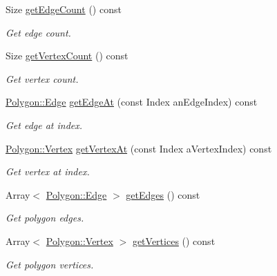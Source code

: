 \begin{DoxyCompactItemize}
Size \hyperlink{classlibrary_1_1math_1_1geom_1_1d3_1_1objects_1_1_polygon_aa9ff0300eec7d810c55c2782fcc46cf6}{get\+Edge\+Count} () const
\begin{DoxyCompactList}\small\item\em Get edge count. \end{DoxyCompactList}\item 
Size \hyperlink{classlibrary_1_1math_1_1geom_1_1d3_1_1objects_1_1_polygon_abdd6fd98e2d0aa2ddb69d842cd7e71c1}{get\+Vertex\+Count} () const
\begin{DoxyCompactList}\small\item\em Get vertex count. \end{DoxyCompactList}\item 
\hyperlink{classlibrary_1_1math_1_1geom_1_1d3_1_1objects_1_1_polygon_a7962e0559e972fe43eef942ce318fb8d}{Polygon\+::\+Edge} \hyperlink{classlibrary_1_1math_1_1geom_1_1d3_1_1objects_1_1_polygon_aa595f3aa1b457b453745692ccee8a808}{get\+Edge\+At} (const Index an\+Edge\+Index) const
\begin{DoxyCompactList}\small\item\em Get edge at index. \end{DoxyCompactList}\item 
\hyperlink{classlibrary_1_1math_1_1geom_1_1d3_1_1objects_1_1_polygon_a12c41d13f2128442c1a15b9eaa08e1d0}{Polygon\+::\+Vertex} \hyperlink{classlibrary_1_1math_1_1geom_1_1d3_1_1objects_1_1_polygon_a3a4caaa18b07b7be061ef8b525493c5e}{get\+Vertex\+At} (const Index a\+Vertex\+Index) const
\begin{DoxyCompactList}\small\item\em Get vertex at index. \end{DoxyCompactList}\item 
Array$<$ \hyperlink{classlibrary_1_1math_1_1geom_1_1d3_1_1objects_1_1_polygon_a7962e0559e972fe43eef942ce318fb8d}{Polygon\+::\+Edge} $>$ \hyperlink{classlibrary_1_1math_1_1geom_1_1d3_1_1objects_1_1_polygon_a90b876b752d49e7f7c65976d2f367086}{get\+Edges} () const
\begin{DoxyCompactList}\small\item\em Get polygon edges. \end{DoxyCompactList}\item 
Array$<$ \hyperlink{classlibrary_1_1math_1_1geom_1_1d3_1_1objects_1_1_polygon_a12c41d13f2128442c1a15b9eaa08e1d0}{Polygon\+::\+Vertex} $>$ \hyperlink{classlibrary_1_1math_1_1geom_1_1d3_1_1objects_1_1_polygon_a6df2edc6429946ebd7b9e96524d725fa}{get\+Vertices} () const
\begin{DoxyCompactList}\small\item\em Get polygon vertices. \end{DoxyCompactList}\item 

\end{DoxyCompactItemize}
